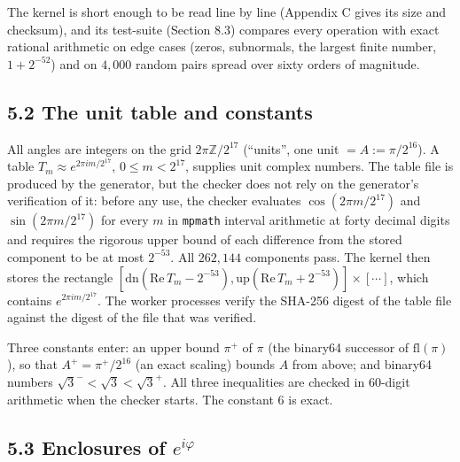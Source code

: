 \documentclass[
  11pt,
]{article}
\begin{document}
The kernel is short enough to be read line by line (Appendix C gives its
size and checksum), and its test-suite (Section 8.3) compares every
operation with exact rational arithmetic on edge cases (zeros,
subnormals, the largest finite number, \(1+2^{-52}\)) and on \(4{,}000\)
random pairs spread over sixty orders of magnitude.

\subsection{5.2 The unit table and
constants}\label{the-unit-table-and-constants}

All angles are integers on the grid \(2\pi\mathbb Z/2^{17}\) (``units'',
one unit \(=A:=\pi/2^{16}\)). A table \(T_m\approx e^{2\pi im/2^{17}}\),
\(0\le m<2^{17}\), supplies unit complex numbers. The table file is
produced by the generator, but the checker does not rely on the
generator's verification of it: before any use, the checker evaluates
\(\cos(2\pi m/2^{17})\) and \(\sin(2\pi m/2^{17})\) for every \(m\) in
\texttt{mpmath} interval arithmetic at forty decimal digits and requires
the rigorous upper bound of each difference from the stored component to
be at most \(2^{-53}\). All \(262{,}144\) components pass. The kernel
then stores the rectangle
\([\mathrm{dn}(\mathrm{Re}\,T_m-2^{-53}),\mathrm{up}(\mathrm{Re}\,T_m+2^{-53})]\times[\cdots]\),
which contains \(e^{2\pi im/2^{17}}\). The worker processes verify the
SHA-256 digest of the table file against the digest of the file that was
verified.

Three constants enter: an upper bound \(\pi^+\) of \(\pi\) (the binary64
successor of \(\mathrm{fl}(\pi)\)), so that \(A^+=\pi^+/2^{16}\) (an
exact scaling) bounds \(A\) from above; and binary64 numbers
\(\sqrt3^-<\sqrt3<\sqrt3^+\). All three inequalities are checked in
\(60\)-digit arithmetic when the checker starts. The constant \(6\) is
exact.

\subsection{\texorpdfstring{5.3 Enclosures of
\(e^{i\varphi}\)}{5.3 Enclosures of e\^{}\{i\textbackslash varphi\}}}\label{enclosures-of-eivarphi}
\end{document}
